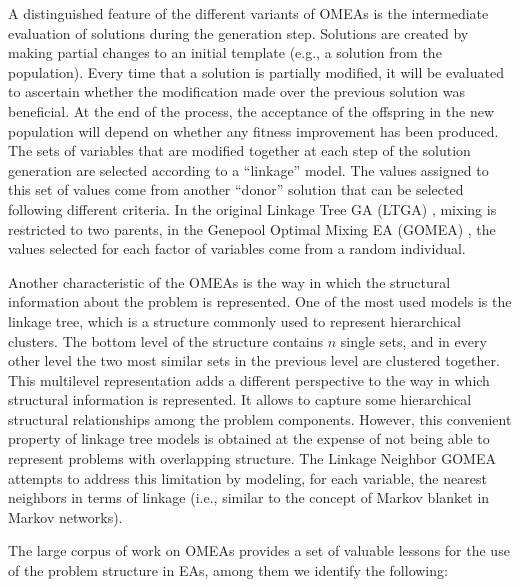 \documentclass{article} %
\begin{document}
  A distinguished feature of the different variants of OMEAs is the intermediate evaluation of solutions during the  generation step. Solutions are created by making partial changes to an initial template (e.g., a solution from the population).  Every time that  a solution  is partially modified, it will be evaluated to ascertain whether the modification made over the previous solution was beneficial. At the end of the process, the acceptance of the offspring in the new population will depend on whether any fitness improvement has been produced.  The sets of variables that are modified together at each step of the solution generation are selected according to a ``linkage'' model. The values assigned to this set of values come from another ``donor'' solution that can be selected following different criteria. In the original Linkage Tree GA (LTGA) \cite{Thierens:2011}, mixing is restricted to two parents, in the Genepool Optimal Mixing EA (GOMEA) \cite{Thierens_and_Bosman:2011}, the values selected for each factor of variables come from a random individual. 

 Another characteristic of the OMEAs is the way in which the structural information about the problem is represented. One of the most used models is the  linkage tree, which is a structure commonly used to represent hierarchical clusters. The bottom level of the structure contains $n$ single sets, and in every other level the two most similar sets in the previous level are clustered together.  This multilevel representation adds a different perspective to the way in which structural information is represented. It allows to capture some hierarchical structural relationships among the problem components. However, this convenient property of linkage tree models  is obtained at the expense of not being able to represent problems with overlapping structure. The Linkage Neighbor GOMEA \cite{Bosman_and_Thierens:2012} attempts to address this limitation by modeling, for each variable, the nearest neighbors in terms of linkage (i.e., similar to the concept of  Markov blanket in Markov networks). 

  The large corpus of work on OMEAs  \cite{Bosman_and_Thierens:2012,Bosman_and_Thierens:2013,Goldman_and_Tauritz:2012,Sadowski_et_al:2016,Thierens_and_Bosman:2011,Wang_et_al:2014} provides a set of valuable lessons for the use of the problem structure in EAs, among them we identify the following:
\end{document}
